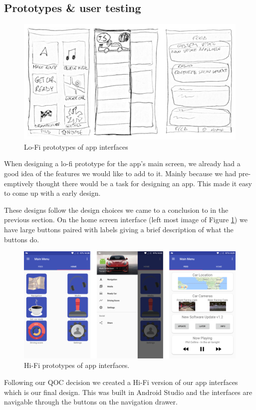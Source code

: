 \documentclass{article}
\begin{document}
\subsection{Prototypes \& user testing}\label{ssec:app-prototypes-testing}
\begin{figure}[H]
  \centering
  \includegraphics[width=\textwidth]{app-lofi}
  \caption{Lo-Fi prototypes of app interfaces}\label{figure-app-lofi}
\end{figure}

When designing a lo-fi prototype for the app's main screen, we already had a good idea of the features we would like to add to it. Mainly because we had pre-emptively thought there would be a task for designing an app. This made it easy to come up with a early design.

These designs follow the design choices we came to a conclusion to in the previous section. On the home screen interface (left most image of Figure \ref{figure-app-lofi}) we have large buttons paired with labels giving a brief description of what the buttons do.  

\begin{figure}[H]
  \centering
  \includegraphics[width=\textwidth]{app-hifi}
  \caption{Hi-Fi prototypes of app interfaces.}\label{figure-app-hifi}
\end{figure}
Following our QOC decision we created a Hi-Fi version of our app interfaces which is our final design. This was built in Android Studio and the interfaces are navigable through the buttons on the navigation drawer.
\end{document}
